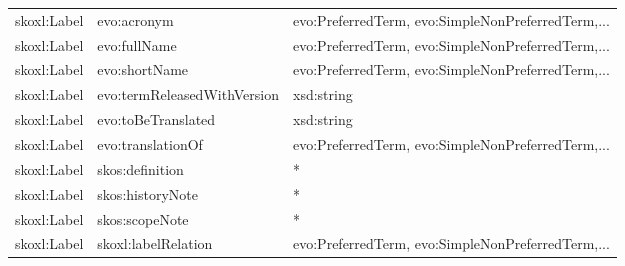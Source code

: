 \documentclass[10pt,a4paper,titlepage,final]{article}
\begin{document}
\begin{tabularx}{\textwidth}{llX}
                  skoxl:Label &                   evo:acronym &  evo:PreferredTerm, evo:SimpleNonPreferredTerm,... \\
                  skoxl:Label &                  evo:fullName &  evo:PreferredTerm, evo:SimpleNonPreferredTerm,... \\
                  skoxl:Label &                 evo:shortName &  evo:PreferredTerm, evo:SimpleNonPreferredTerm,... \\
                  skoxl:Label &   evo:termReleasedWithVersion &                                         xsd:string \\
                  skoxl:Label &            evo:toBeTranslated &                                         xsd:string \\
                  skoxl:Label &             evo:translationOf &  evo:PreferredTerm, evo:SimpleNonPreferredTerm,... \\
                  skoxl:Label &               skos:definition &                                                  * \\
                  skoxl:Label &              skos:historyNote &                                                  * \\
                  skoxl:Label &                skos:scopeNote &                                                  * \\
                  skoxl:Label &           skoxl:labelRelation &  evo:PreferredTerm, evo:SimpleNonPreferredTerm,... \\
\end{tabularx}
\end{document}
